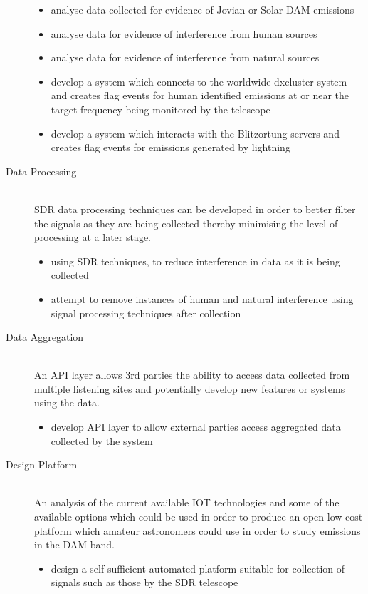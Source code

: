 \documentclass[runningheads,a4paper]{llncs}
\begin{document}
\begin{description}
    \begin{itemize}
      \item analyse data collected for evidence of Jovian or Solar \gls{DAM} emissions
      \item analyse data for evidence of interference from human sources
      \item analyse data for evidence of interference from natural sources
      \item develop a system which connects to the worldwide dxcluster system and creates flag events for human identified emissions at or near the target frequency being monitored by the telescope
      \item develop a system which interacts with the Blitzortung servers and creates flag events for emissions generated by lightning \\
    \end{itemize}
  \item [Data Processing] \hfill \\
    \gls{SDR} data processing techniques can be developed in order to better filter the signals as they are being collected thereby minimising the level of processing at a later stage.
    \begin{itemize}
      \item using \gls{SDR} techniques, to reduce interference in data as it is being collected
      \item attempt to remove instances of human and natural interference using signal processing techniques after collection \\
    \end{itemize}
  \item [Data Aggregation] \hfill \\
    An API layer allows 3rd parties the ability to access data collected from multiple listening sites and potentially develop new features or systems using the data.
    \begin{itemize}
      \item develop API layer to allow external parties access aggregated data collected by the system \\
    \end{itemize}
  \item [Design Platform] \hfill \\
    An analysis of the current available \gls{IOT} technologies and some of the available options which could be used in order to produce an open low cost platform which amateur astronomers could use in order to study emissions in the \gls{DAM} band.
    \begin{itemize}
      \item design a self sufficient automated platform suitable for collection of signals such as those by the \gls{SDR} telescope \\
    \end{itemize}
\end{description}
\end{document}
